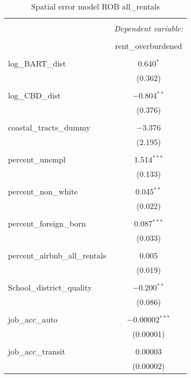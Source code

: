 \documentclass[10pt, letterpaper]{amsart}
\begin{document}
\begin{table}[H] \centering 
  \caption{Spatial error model ROB all\_rentals}
  \label{}
  \begin{tabular}{@{\extracolsep{5pt}}lc} 
    \\[-1.8ex]\hline 
    \hline \\[-1.8ex] 
    & \multicolumn{1}{c}{\textit{Dependent variable:}} \\ 
    \cline{2-2} 
    \\[-1.8ex] & rent\_overburdened \\ 
    \hline \\[-1.8ex] 
    log\_BART\_dist & 0.640$^{*}$ \\ 
    & (0.362) \\ 
    & \\ 
    log\_CBD\_dist & $-$0.804$^{**}$ \\ 
    & (0.376) \\ 
    & \\ 
    coastal\_tracts\_dummy & $-$3.376 \\ 
    & (2.195) \\ 
    & \\ 
    percent\_unempl & 1.514$^{***}$ \\ 
    & (0.133) \\ 
    & \\ 
    percent\_non\_white & 0.045$^{**}$ \\ 
    & (0.022) \\ 
    & \\ 
    percent\_foreign\_born & 0.087$^{***}$ \\ 
    & (0.033) \\ 
    & \\ 
    percent\_airbnb\_all\_rentals & 0.005 \\ 
    & (0.019) \\ 
    & \\ 
    School\_district\_quality & $-$0.200$^{**}$ \\ 
    & (0.086) \\ 
    & \\ 
    job\_acc\_auto & $-$0.00002$^{***}$ \\ 
    & (0.00001) \\ 
    & \\ 
    job\_acc\_transit & 0.00003 \\ 
    & (0.00002) \\ 

\end{tabular}
\end{table}
\end{document}
